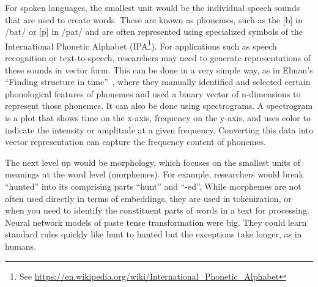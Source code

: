 
For spoken languages, the smallest unit would be the individual speech sounds that are used to create words. These are known as phonemes, such as the [b] in /bat/ or [p] in /pat/ and are often represented using specialized symbols of the International Phonetic Alphabet (IPA\footnote{See \url{https://en.wikipedia.org/wiki/International_Phonetic_Alphabet}}). For applications such as speech recognition or text-to-speech, researchers may need to generate representations of these sounds in vector form. 
This can be done in a very simple way, as in Elman's ``Finding structure in time''~\cite{elman1990finding}, where they manually identified and selected certain phonological features of phonemes and used a binary vector of n-dimensions to represent those phonemes.
It can also be done using spectrograms. A spectrogram is a plot that shows time on the x-axis, frequency on the y-axis, and uses color to indicate the intensity or amplitude at a given frequency. Converting this data into vector representation can capture the frequency content of phonemes.

%
%
%

The next level up would be morphology, which focuses on the smallest units of meanings at the word level (morphemes). For example, researchers would break ``hunted'' into its comprising parts ``hunt'' and ``-ed''. While morphemes are not often used directly in terms of embeddings, they are used in tokenization, or when you need to identify the constituent parts of words in a text for processing. 
Neural network models of paste tense transformation were big. They could learn standard rules quickly like hunt to hunted but the exceptions take longer, as in humans. %

